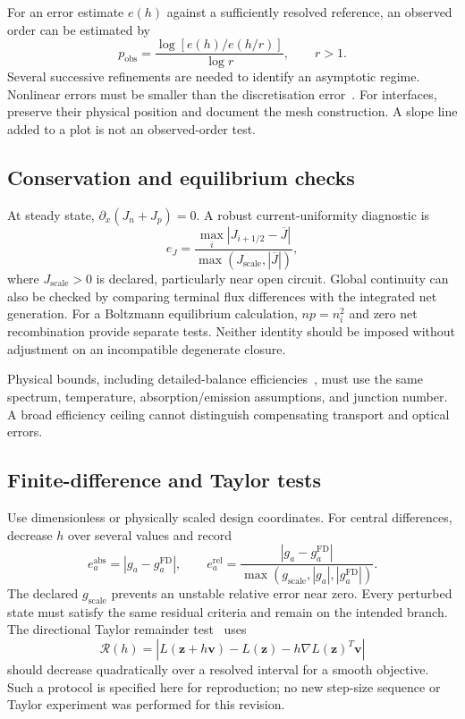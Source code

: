\documentclass[11pt,a4paper]{article}
\numberwithin{equation}{section}
\begin{document}
For an error estimate $e(h)$ against a sufficiently resolved reference,
an observed order can be estimated by
\begin{equation}
p_{\mathrm{obs}}=\frac{\log[e(h)/e(h/r)]}{\log r},\qquad r>1.
\end{equation}
Several successive refinements are needed to identify an asymptotic
regime. Nonlinear errors must be smaller than the discretisation
error~\cite{salari2000,oberkampf2002}.
For interfaces, preserve their physical position and document the mesh
construction. A slope line added to a plot is not an observed-order test.

\subsection{Conservation and equilibrium checks}
At steady state, $\partial_x(J_n+J_p)=0$. A robust current-uniformity
diagnostic is
\begin{equation}
e_J=\frac{\max_i|J_{i+1/2}-\overline J|}
{\max(J_{\mathrm{scale}},|\overline J|)},
\end{equation}
where $J_{\mathrm{scale}}>0$ is declared, particularly near open circuit.
Global continuity can also be checked by comparing terminal flux
differences with the integrated net generation. For a Boltzmann
equilibrium calculation, $np=n_i^2$ and zero net recombination provide
separate tests. Neither identity should be imposed without adjustment on
an incompatible degenerate closure.

Physical bounds, including detailed-balance efficiencies~\cite{shockley1961},
must use the same spectrum, temperature, absorption/emission assumptions,
and junction number. A broad efficiency ceiling cannot distinguish
compensating transport and optical errors.

\subsection{Finite-difference and Taylor tests}
Use dimensionless or physically scaled design coordinates. For central
differences, decrease $h$ over several values and record
\begin{equation}
e_a^{\mathrm{abs}}=|g_a-g_a^{\mathrm{FD}}|,\qquad
e_a^{\mathrm{rel}}=\frac{|g_a-g_a^{\mathrm{FD}}|}
{\max(g_{\mathrm{scale}},|g_a|,|g_a^{\mathrm{FD}}|)}.
\end{equation}
The declared $g_{\mathrm{scale}}$ prevents an unstable relative error
near zero. Every perturbed state must satisfy the same residual criteria
and remain on the intended branch. The directional Taylor remainder
test~\cite{dolfinverification} uses
\begin{equation}
\mathcal R(h)=\left|L(\boldsymbol z+h\boldsymbol v)-L(\boldsymbol z)
-h\nabla L(\boldsymbol z)^T\boldsymbol v\right|
\end{equation}
should decrease quadratically over a resolved interval for a smooth
objective. Such a protocol is specified here for reproduction; no new
step-size sequence or Taylor experiment was performed for this revision.
\end{document}
